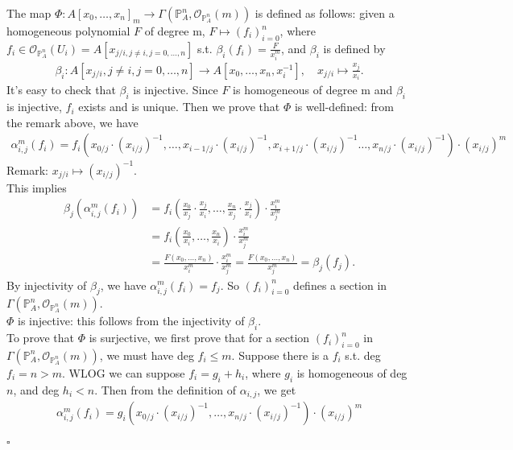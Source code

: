\documentclass{article}
\newenvironment{Proof}{{\noindent \indent \it Proof:\quad}}{\hfill $\square$\par}
\begin{document}
\begin{Proof}
The map $\Phi: A[x_0,\dots,x_n]_{m} \rightarrow \Gamma(\mathbb{P}_A^n,\mathcal{O}_{\mathbb{P}_A^n}(m))$ is defined as follows: given a homogeneous polynomial $F$ of degree m, $F \mapsto (f_i)_{i=0}^n$, where $f_i \in \mathcal{O}_{\mathbb{P}_A^n}(U_i) = A[x_{j/i, j \neq i, j=0,\dots,n}]$ s.t. $\beta_i (f_i) = \frac{F}{x_i^m}$, and $\beta_i$ is defined by 
\begin{align*}
    \beta_i:A[x_{j/i}, j\neq i, j=0,\dots,n] \rightarrow A[x_0,\dots,x_n,x_i^{-1}],
    \quad x_{j/i} \mapsto \frac{x_j}{x_i}.
\end{align*} 
It's easy to check that $\beta_i$ is injective.
Since $F$ is homogeneous of degree m and $\beta_i$ is injective, $f_i$ exists and is unique. Then we prove that $\Phi$ is well-defined: from the remark above, we have
\begin{align*}
    \alpha_{i,j}^m(f_i) = f_i(x_{0/j}\cdot(x_{i/j})^{-1}, \dots, x_{i-1/j}\cdot(x_{i/j})^{-1},x_{i+1/j}\cdot(x_{i/j})^{-1} \dots, x_{n/j}\cdot(x_{i/j})^{-1}) \cdot (x_{i/j})^m
\end{align*}
Remark: $x_{j/i}\mapsto (x_{i/j})^{-1}$.
\\
This implies 
\begin{align*}
\beta_j(\alpha_{i,j}^m(f_i))
    &= f_i(\frac{x_0}{x_j}\cdot \frac{x_j}{x_i}, \dots, \frac{x_n}{x_j}\cdot \frac{x_j}{x_i})\cdot \frac{x_i^m}{x_j^m}\\
    &= f_i(\frac{x_0}{x_i},\dots,\frac{x_n}{x_i})\cdot \frac{x_i^m}{x_j^m}\\
    &= \frac{F(x_0,\dots,x_n)}{x_i^m} \cdot \frac{x_i^m}{x_j^m}
    = \frac{F(x_0,\dots,x_n)}{x_j^m} = \beta_j(f_j).
\end{align*}
By injectivity of $\beta_j$, we have $\alpha_{i,j}^m(f_i)=f_j$. So $(f_i)_{i=0}^n$ defines a section in $\Gamma(\mathbb{P}_A^n,\mathcal{O}_{\mathbb{P}_A^n}(m))$. 
\\
$\Phi$ is injective: this follows from the injectivity of $\beta_i$.\\
To prove that $\Phi$ is surjective, we first prove that for a section $(f_i)_{i=0}^n$ in $\Gamma(\mathbb{P}_A^n,\mathcal{O}_{\mathbb{P}_A^n}(m))$, we must have deg $f_i \leq m$. Suppose there is a $f_i$ s.t. deg$f_i =n>m$. WLOG we can suppose $f_i = g_i+h_i$, where $g_i$ is homogeneous of deg $n$, and deg $h_i<n$. Then from the definition of $\alpha_{i,j}$, we get
\begin{align*}
    \alpha_{i,j}^m(f_i) = g_i(x_{0/j}\cdot(x_{i/j})^{-1}, \dots, x_{n/j}\cdot(x_{i/j})^{-1}) \cdot (x_{i/j})^m \\

\end{align*}
\end{Proof}
\end{document}
